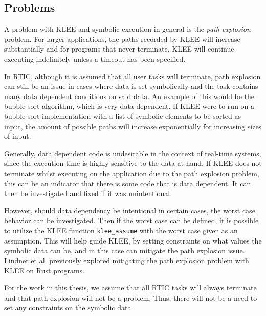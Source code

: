\subsection{Problems}
A problem with KLEE and symbolic execution in general is the \emph{path
explosion} problem. For larger applications, the paths recorded by KLEE will
increase substantially and for programs that never terminate, KLEE will
continue executing indefinitely unless a timeout has been specified.

In RTIC, although it is assumed that all user tasks will terminate, path
explosion can still be an issue in cases where data is set symbolically and the
task contains many data dependent conditions on said data. An example of this
would be the bubble sort algorithm, which is very data dependent. If KLEE were
to run on a bubble sort implementation with a list of symbolic elements to be
sorted as input, the amount of possible paths will increase exponentially for
increasing sizes of input.

Generally, data dependent code is undesirable in the context of real-time
systems, since the execution time is highly sensitive to the data at hand. If
KLEE does not terminate whilst executing on the application due to the path
explosion problem, this can be an indicator that there is some code that is
data dependent. It can then be investigated and fixed if it was unintentional.

However, should data dependency be intentional in certain cases, the worst case
behavior can be investigated. Then if the worst case can be defined, it is
possible to utilize the KLEE function
\texttt{klee\_assume}\cite{kleeintrinsics} with the worst case given as an
assumption. This will help guide KLEE, by setting constraints on what values
the symbolic data can be, and in this case can mitigate the path explosion
issue. Lindner et al. previously explored mitigating the path explosion problem
with KLEE on Rust programs\cite{nopanic}.

For the work in this thesis, we assume that all RTIC tasks will always
terminate and that path explosion will not be a problem. Thus, there will
not be a need to set any constraints on the symbolic data.
